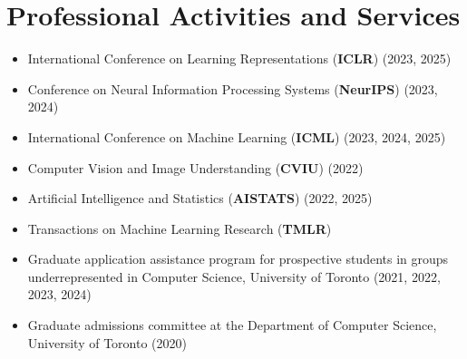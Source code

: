 \section*{Professional Activities and Services}
\vspace{\postsubhead}
\begin{adjustwidth}{\indentleft}{\indentright}
  \begin{itemize}
    \setlength\itemsep{0.1em}
    \item International Conference on Learning Representations (\textbf{ICLR}) (2023, 2025)
    \item Conference on Neural Information Processing Systems  (\textbf{NeurIPS}) (2023, 2024)
    \item International Conference on Machine Learning (\textbf{ICML}) (2023, 2024, 2025)
    \item Computer Vision and Image Understanding (\textbf{CVIU}) (2022)
    \item Artificial Intelligence and Statistics (\textbf{AISTATS}) (2022, 2025)
    \item Transactions on Machine Learning Research (\textbf{TMLR}) 
    \item Graduate application assistance program for prospective students in groups underrepresented in Computer Science, University of Toronto (2021, 2022, 2023, 2024)
    \item Graduate admissions committee at the Department of Computer Science, University of Toronto (2020)
    
  \end{itemize}
\end{adjustwidth}
